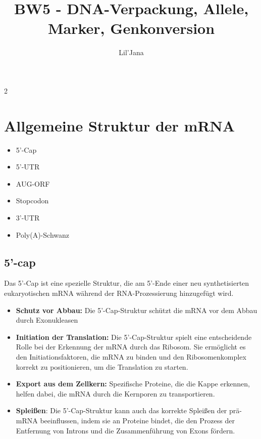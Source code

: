 \documentclass{article}
\title{BW5 - DNA-Verpackung, Allele, Marker, Genkonversion}
\author{Lil'Jana}
\begin{document}
\maketitle
\tableofcontents
\newpage

\begin{multicols}{2}
\section{Allgemeine Struktur der mRNA}
\begin{itemize}
    \item 5'-Cap
    \item 5'-UTR
    \item AUG-ORF
    \item Stopcodon
    \item 3'-UTR
    \item Poly(A)-Schwanz
\end{itemize}

\subsection{5'-cap}
\begin{mybox}[title=5'-cap]     
Das 5'-Cap ist eine spezielle Struktur, die am 5'-Ende einer neu synthetisierten eukaryotischen mRNA während der RNA-Prozessierung hinzugefügt wird.
\end{mybox}
\begin{itemize}
    \item \textbf{Schutz vor Abbau:} Die 5'-Cap-Struktur schützt die mRNA vor dem Abbau durch Exonukleasen
    \item \textbf{Initiation der Translation:} Die 5'-Cap-Struktur spielt eine entscheidende Rolle bei der Erkennung der mRNA durch das Ribosom. Sie ermöglicht es den Initiationsfaktoren, die mRNA zu binden und den Ribosomenkomplex korrekt zu positionieren, um die Translation zu starten.
    \item \textbf{Export aus dem Zellkern:} Spezifische Proteine, die die Kappe erkennen, helfen dabei, die mRNA durch die Kernporen zu transportieren.
    \item \textbf{Spleißen}: Die 5'-Cap-Struktur kann auch das korrekte Spleißen der prä-mRNA beeinflussen, indem sie an Proteine bindet, die den Prozess der Entfernung von Introns und die Zusammenführung von Exons fördern.
\end{itemize}


\end{multicols}
\end{document}
